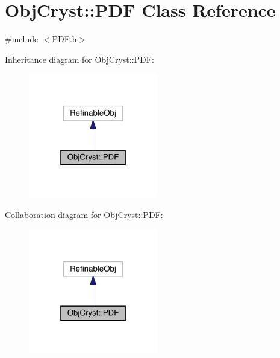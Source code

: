 \hypertarget{class_obj_cryst_1_1_p_d_f}{}\section{Obj\+Cryst\+::P\+DF Class Reference}
\label{class_obj_cryst_1_1_p_d_f}


{\ttfamily \#include $<$P\+D\+F.\+h$>$}



Inheritance diagram for Obj\+Cryst\+::P\+DF\+:
\nopagebreak
\begin{figure}[H]
\begin{center}
\leavevmode
\includegraphics[width=160pt]{class_obj_cryst_1_1_p_d_f__inherit__graph}
\end{center}
\end{figure}


Collaboration diagram for Obj\+Cryst\+::P\+DF\+:
\nopagebreak
\begin{figure}[H]
\begin{center}
\leavevmode
\includegraphics[width=160pt]{class_obj_cryst_1_1_p_d_f__coll__graph}
\end{center}
\end{figure}
